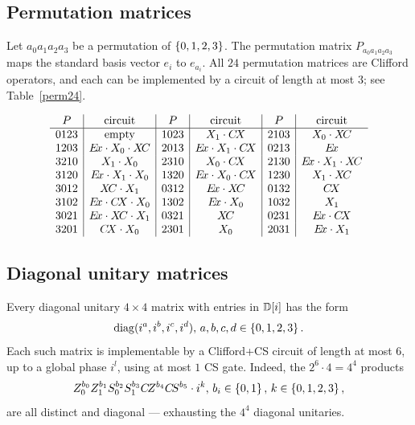 \documentclass[reprint,amsmath,amssymb,aps,pra]{revtex4-2}
\begin{document}
\subsection{Permutation matrices}
Let $a_0 a_1 a_2 a_3$ be a permutation of $\left\{0,1,2,3\right\}$. The
permutation matrix $P_{a_0 a_1 a_2 a_3}$ maps the standard basis
vector $e_i$ to $e_{a_i}$. All $24$ permutation matrices are Clifford
operators, and each can be implemented by a circuit of length at most
$3$; see Table~\ref{perm24}.

\begin{table}
  \centering
  \[
    \begin{array}{c|c|c|c|c|c}
      P    & \text{circuit}          & P    & \text{circuit}          & P    & \text{circuit}          \\
      \hline
      0123 & \text{empty}            & 1023 & X_1 \cdot \CX           & 2103 & X_0 \cdot \XC           \\
      1203 & \Ex \cdot X_0 \cdot \XC & 2013 & \Ex \cdot X_1 \cdot \CX & 0213 & \Ex                     \\
      3210 & X_1 \cdot X_0           & 2310 & X_0 \cdot \CX           & 2130 & \Ex \cdot X_1 \cdot \XC \\
      3120 & \Ex \cdot X_1 \cdot X_0 & 1320 & \Ex \cdot X_0 \cdot \CX & 1230 & X_1 \cdot \XC           \\
      3012 & \XC \cdot X_1           & 0312 & \Ex \cdot \XC           & 0132 & \CX                     \\
      3102 & \Ex \cdot \CX \cdot X_0 & 1302 & \Ex \cdot X_0           & 1032 & X_1                     \\
      3021 & \Ex \cdot \XC \cdot X_1 & 0321 & \XC                     & 0231 & \Ex \cdot \CX           \\
      3201 & \CX \cdot X_0           & 2301 & X_0                     & 2031 & \Ex \cdot X_1
    \end{array}
  \]
  \caption{Circuit implementations of the $24$ permutation matrices.}
  \label{perm24}
\end{table}

\subsection{Diagonal unitary matrices}

Every diagonal unitary $4 \times 4$ matrix with entries in ${\mathbb D}[i]$ has
the form
\[
  \mathrm{diag}(i^a, i^b, i^c, i^d), \, a, b, c, d \in \left\{0,1,2,3\right\}.
\]
Each such matrix is implementable by a Clifford+CS circuit of length
at most $6$, up to a global phase $i^l$, using at most $1$ CS
gate. Indeed, the $2^6 \cdot 4 = 4^4$ products
\[
  Z_0^{b_0} Z_1^{b_1} S_0^{b_2} S_1^{b_3} C\kern-.16667em Z^{b_4} C\kern-.16667em S^{b_5} \cdot
  i^k, \, b_i \in \left\{0,1\right\}, \, k \in \left\{0,1,2,3\right\},
\]
are all distinct and diagonal — exhausting the $4^4$ diagonal
unitaries.
\end{document}
